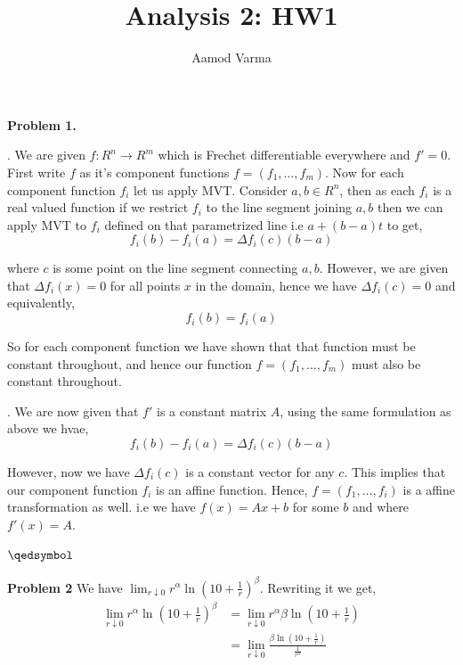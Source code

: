 \documentclass[a4paper]{article}
\title{Analysis 2: HW1}
\author{Aamod Varma}
\begin{document}
\maketitle
\textbf{Problem 1.}

. We are given $f: R^{n} \to R^{m}$ which is Frechet differentiable everywhere and $f' = 0$. First write $f$ as it's component functions $f = (f_{1}, \dots, f_m)$. Now for each component function $f_i$ let us apply MVT. Consider $a, b \in R^{n}$, then as each $f_i$ is a real valued function if we restrict $f_i$ to the line segment joining $a, b$ then we can apply MVT to $f_i$ defined on that parametrized line i.e $a + (b - a)t$ to get,
\[
    f_i(b) - f_i(a) = \Delta f_i(c) (b - a)
\]

where $c$ is some point on the line segment connecting $a, b$. However, we are given that $\Delta f_i(x) = 0$  for all points $x$ in the domain, hence we have $\Delta f_i(c) = 0$ and equivalently, 
\[
    f_i(b) = f_i(a)
\]

So for each component function we have shown that that function must be constant throughout, and hence our function $f = (f_{1}, \dots, f_m)$ must also be constant throughout.


\vspace{1em}

. We are now given that $f'$ is a constant matrix $A$, using the same formulation as above we hvae, 
\[
    f_i(b) - f_i(a) = \Delta f_i(c) (b - a)
\]

However, now we have $\Delta f_i(c)$  is a constant vector for any $c$. This implies that our component function $f_i$ is an affine function. Hence, $f = (f_{1},\dots, f_i)$ is a affine transformation as well. i.e we have $f(x) = Ax + b$ for some $b$ and where $f'(x) = A$.


$\hfill\qedsymbol$

\textbf{Problem 2}
We have $\lim_{r \downarrow 0} r^{\alpha} \ln \left ( 10 + \frac{1}{r}\right )^{\beta}$. Rewriting it we get, 
\begin{align*}
    \lim_{r \downarrow 0} r^{\alpha} \ln \left ( 10 + \frac{1}{r}\right )^{\beta} &=     \lim_{r \downarrow 0} r^{\alpha} \beta \ln  \left ( 10 + \frac{1}{r}\right ) \\
    &=  \lim_{r \downarrow 0} \frac{\beta \ln  \left ( 10 + \frac{1}{r}\right )}{\frac{1}{r^{\alpha}}} \\
\end{align*}
\end{document}
